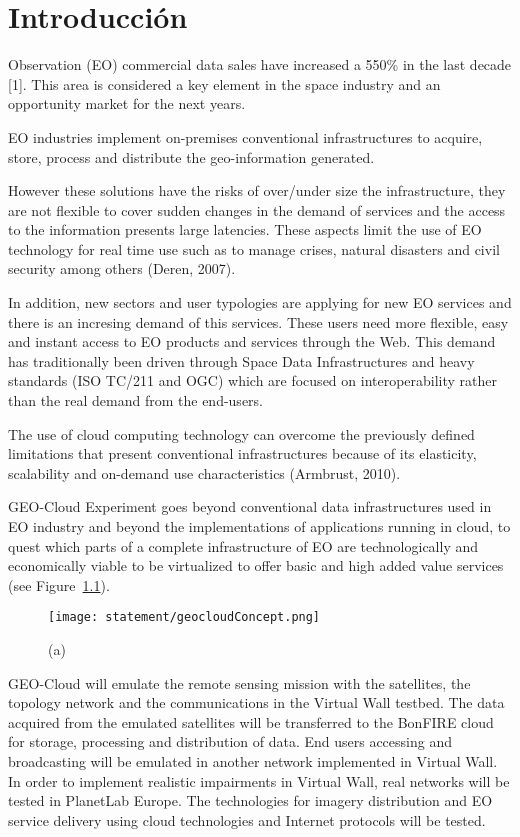 \chapter{Introducción}

 Observation (EO) commercial data sales have increased a 550\% in
the last decade \cite{sousa}[1]. This area is considered a key element in the
space industry and an opportunity market for the next years. 

EO industries implement on-premises conventional infrastructures to acquire,
store, process and distribute the geo-information generated. 

However these solutions have the risks of over/under size the infrastructure, they are not flexible to cover sudden changes in the demand of services and the access to the information presents large latencies.  These aspects limit the use of EO technology for real time use such as to manage crises, natural disasters and civil security among others (Deren, 2007).

In addition, new sectors and user typologies are applying for new EO services
and there is an incresing demand of this services. These users
need more flexible, easy and instant access to EO products and services through
the Web. This demand has traditionally been driven through Space Data
Infrastructures and heavy standards (ISO TC/211 and OGC) which are focused on
interoperability rather than the real demand from the end-users. 

The use of cloud computing technology can overcome the previously defined limitations that present conventional infrastructures because of its elasticity, scalability and on-demand use characteristics (Armbrust, 2010). 

GEO-Cloud Experiment goes beyond conventional data infrastructures used in EO
industry and beyond the implementations of applications running in cloud, to
quest which parts of a complete infrastructure of EO are technologically and
economically viable to be virtualized to offer basic and high added value
services (see Figure~\ref{fig:intr-geocloudConcept}).

\begin{figure}[!h]
\begin{center}
\texttt{[image: statement/geocloudConcept.png]}
\caption{(a)}
\label{fig:intr-geocloudConcept}
\end{center}
\end{figure}
 

GEO-Cloud will emulate the remote sensing mission with the satellites, the
topology network and the communications in the Virtual Wall testbed. The data
acquired from the emulated satellites will be transferred to the BonFIRE cloud
for storage, processing and distribution of data. End users accessing and
broadcasting will be emulated in another network implemented in Virtual Wall. In
order to implement realistic impairments in Virtual Wall, real networks will be
tested in PlanetLab Europe.  The technologies for imagery distribution and EO
service delivery using cloud technologies and Internet protocols will be tested.


